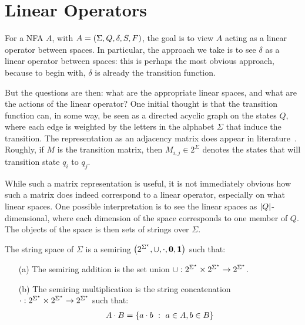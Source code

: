 
\section{Linear Operators}



For a NFA \(A\), with \(A = \left(\Sigma, Q, \delta, S, F\right)\),
the goal is to view \(A\) acting as a linear operator between spaces.
In particular, the approach we take is to see \(\delta\) as a
linear operator between spaces: this is perhaps the most obvious approach,
because to begin with, \(\delta\) is already the transition function.

But the questions are then:
what are the appropriate linear spaces,
and what are the actions of the linear operator?
One initial thought is that the transition function can, in some way,
be seen as a directed acyclic graph on the states \(Q\),
where each edge is weighted by the letters in the alphabet \(\Sigma\)
that induce the transition.
The representation as an adjacency matrix does appear in
literature~\cite{savage1998models}.
Roughly, if \(M\) is the transition matrix, then \(M_{i, j} \in 2^{\Sigma}\)
denotes the states that will transition state \(q_i\) to \(q_j\).

While such a matrix representation is useful,
it is not immediately obvious how such a matrix does indeed correspond
to a linear operator, especially on what linear spaces.
One possible interpretation is to see
the linear spaces as \(\left\lvert Q\right\rvert\)-dimensional,
where each dimension of the space corresponds to one member of \(Q\).
The objects of the space is then sets of strings over \(\Sigma\).

\begin{definition}
  The string space of \(\Sigma\) is a semiring
  \(\left(2^{\Sigma^\star}, \cup, \cdot, \mathbf{0}, \mathbf{1}\right)\)
  such that:
  \begin{enumerate}
    \item[(a)]
      The semiring addition is the set union
      \(\cup : 2^{\Sigma^\star} \times
        2^{\Sigma^\star} \to 2^{\Sigma^\star}\).

    \item[(b)]
      The semiring multiplication is the string concatenation
      \(\cdot : 2^{\Sigma^\star} \times
        2^{\Sigma^\star} \to 2^{\Sigma^\star}\)
      such that:
      \begin{align*}
        A \cdot B
          = \left\{a \cdot b \  : \  a \in A, b \in B\right\}
      \end{align*}
  \end{enumerate}
\end{definition}

